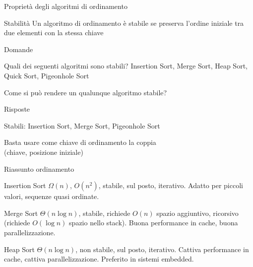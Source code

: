 \begin{frame}{Proprietà degli algoritmi di ordinamento}
\begin{block}{Stabilità}
Un algoritmo di ordinamento è \alert{stabile} se preserva l'ordine iniziale tra due elementi con la stessa chiave
\end{block}

\bigskip
\begin{block}{Domande}
\BI
\item Quali dei seguenti algoritmi sono stabili? Insertion Sort, Merge Sort, Heap Sort, Quick Sort, Pigeonhole Sort
\item Come si può rendere un qualunque algoritmo stabile?
\EI
\end{block}

\pause
\bigskip
\begin{block}{Risposte}
\BI
\item Stabili: Insertion Sort, Merge Sort, Pigeonhole Sort
\item  Basta usare come chiave di ordinamento la coppia\\ (chiave, posizione iniziale) 
\EI
\end{block}
\end{frame}%

\begin{frame}{Riassunto ordinamento}
\begin{block}{Insertion Sort}
$\Omega(n)$, $O(n^2)$, stabile, sul posto, iterativo. Adatto per piccoli valori, sequenze quasi ordinate.
\end{block}
\begin{block}{Merge Sort} 
$\Theta(n\log n)$, stabile, richiede $O(n)$ spazio aggiuntivo, ricorsivo (richiede $O(\log n)$ spazio nello stack). Buona performance in cache, buona parallelizzazione.
\end{block}
\begin{block}{Heap Sort}
$\Theta(n\log n)$, non stabile, sul posto, iterativo. Cattiva performance in cache, cattiva parallelizzazione. Preferito in sistemi embedded.
\end{block}
\end{frame}%

